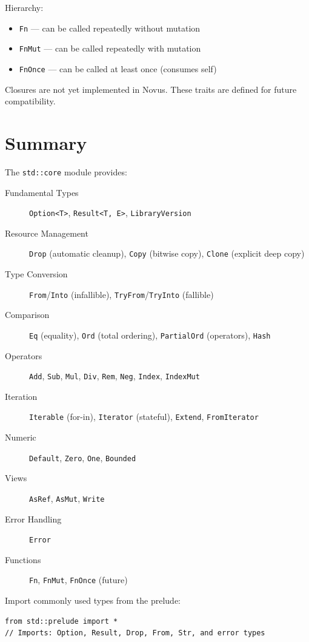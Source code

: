 Hierarchy:
\begin{itemize}
    \item \texttt{Fn} --- can be called repeatedly without mutation
    \item \texttt{FnMut} --- can be called repeatedly with mutation
    \item \texttt{FnOnce} --- can be called at least once (consumes self)
\end{itemize}

\begin{notebox}
Closures are not yet implemented in Novus. These traits are defined for future compatibility.
\end{notebox}

\section{Summary}
\label{sec:core-summary}

The \texttt{std::core} module provides:

\begin{description}
    \item[Fundamental Types] \texttt{Option<T>}, \texttt{Result<T, E>}, \texttt{LibraryVersion}

    \item[Resource Management] \texttt{Drop} (automatic cleanup), \texttt{Copy} (bitwise copy), \texttt{Clone} (explicit deep copy)

    \item[Type Conversion] \texttt{From}/\texttt{Into} (infallible), \texttt{TryFrom}/\texttt{TryInto} (fallible)

    \item[Comparison] \texttt{Eq} (equality), \texttt{Ord} (total ordering), \texttt{PartialOrd} (operators), \texttt{Hash}

    \item[Operators] \texttt{Add}, \texttt{Sub}, \texttt{Mul}, \texttt{Div}, \texttt{Rem}, \texttt{Neg}, \texttt{Index}, \texttt{IndexMut}

    \item[Iteration] \texttt{Iterable} (for-in), \texttt{Iterator} (stateful), \texttt{Extend}, \texttt{FromIterator}

    \item[Numeric] \texttt{Default}, \texttt{Zero}, \texttt{One}, \texttt{Bounded}

    \item[Views] \texttt{AsRef}, \texttt{AsMut}, \texttt{Write}

    \item[Error Handling] \texttt{Error}

    \item[Functions] \texttt{Fn}, \texttt{FnMut}, \texttt{FnOnce} (future)
\end{description}

\begin{tipbox}
Import commonly used types from the prelude:
\begin{lstlisting}
from std::prelude import *
// Imports: Option, Result, Drop, From, Str, and error types
\end{lstlisting}
\end{tipbox}
